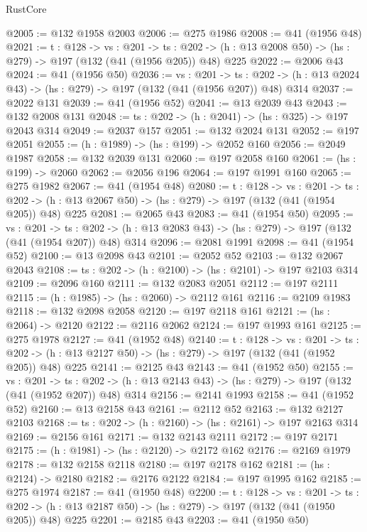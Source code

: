\begin{lexlean}{RustCore}
\begin{coremodule}
@2005 := @132 @1958 @2003
@2006 := @275 @1986
@2008 := @41 (@1956 @48)
@2021 := {t : @128} ->
  {vs : @201} ->
  {ts : @202} -> (h : @13 @2008 @50) -> (hs : @279) -> @197 (@132 (@41 (@1956 @205)) @48) @225
@2022 := @2006 @43
@2024 := @41 (@1956 @50)
@2036 := {vs : @201} ->
  {ts : @202} -> (h : @13 @2024 @43) -> (hs : @279) -> @197 (@132 (@41 (@1956 @207)) @48) @314
@2037 := @2022 @131
@2039 := @41 (@1956 @52)
@2041 := @13 @2039 @43
@2043 := @132 @2008 @131
@2048 := {ts : @202} -> (h : @2041) -> (hs : @325) -> @197 @2043 @314
@2049 := @2037 @157
@2051 := @132 @2024 @131
@2052 := @197 @2051
@2055 := (h : @1989) -> (hs : @199) -> @2052 @160
@2056 := @2049 @1987
@2058 := @132 @2039 @131
@2060 := @197 @2058 @160
@2061 := (hs : @199) -> @2060
@2062 := @2056 @196
@2064 := @197 @1991 @160
@2065 := @275 @1982
@2067 := @41 (@1954 @48)
@2080 := {t : @128} ->
  {vs : @201} ->
  {ts : @202} -> (h : @13 @2067 @50) -> (hs : @279) -> @197 (@132 (@41 (@1954 @205)) @48) @225
@2081 := @2065 @43
@2083 := @41 (@1954 @50)
@2095 := {vs : @201} ->
  {ts : @202} -> (h : @13 @2083 @43) -> (hs : @279) -> @197 (@132 (@41 (@1954 @207)) @48) @314
@2096 := @2081 @1991
@2098 := @41 (@1954 @52)
@2100 := @13 @2098 @43
@2101 := @2052 @52
@2103 := @132 @2067 @2043
@2108 := {ts : @202} -> (h : @2100) -> (hs : @2101) -> @197 @2103 @314
@2109 := @2096 @160
@2111 := @132 @2083 @2051
@2112 := @197 @2111
@2115 := (h : @1985) -> (hs : @2060) -> @2112 @161
@2116 := @2109 @1983
@2118 := @132 @2098 @2058
@2120 := @197 @2118 @161
@2121 := (hs : @2064) -> @2120
@2122 := @2116 @2062
@2124 := @197 @1993 @161
@2125 := @275 @1978
@2127 := @41 (@1952 @48)
@2140 := {t : @128} ->
  {vs : @201} ->
  {ts : @202} -> (h : @13 @2127 @50) -> (hs : @279) -> @197 (@132 (@41 (@1952 @205)) @48) @225
@2141 := @2125 @43
@2143 := @41 (@1952 @50)
@2155 := {vs : @201} ->
  {ts : @202} -> (h : @13 @2143 @43) -> (hs : @279) -> @197 (@132 (@41 (@1952 @207)) @48) @314
@2156 := @2141 @1993
@2158 := @41 (@1952 @52)
@2160 := @13 @2158 @43
@2161 := @2112 @52
@2163 := @132 @2127 @2103
@2168 := {ts : @202} -> (h : @2160) -> (hs : @2161) -> @197 @2163 @314
@2169 := @2156 @161
@2171 := @132 @2143 @2111
@2172 := @197 @2171
@2175 := (h : @1981) -> (hs : @2120) -> @2172 @162
@2176 := @2169 @1979
@2178 := @132 @2158 @2118
@2180 := @197 @2178 @162
@2181 := (hs : @2124) -> @2180
@2182 := @2176 @2122
@2184 := @197 @1995 @162
@2185 := @275 @1974
@2187 := @41 (@1950 @48)
@2200 := {t : @128} ->
  {vs : @201} ->
  {ts : @202} -> (h : @13 @2187 @50) -> (hs : @279) -> @197 (@132 (@41 (@1950 @205)) @48) @225
@2201 := @2185 @43
@2203 := @41 (@1950 @50)

\end{coremodule}
\end{lexlean}
